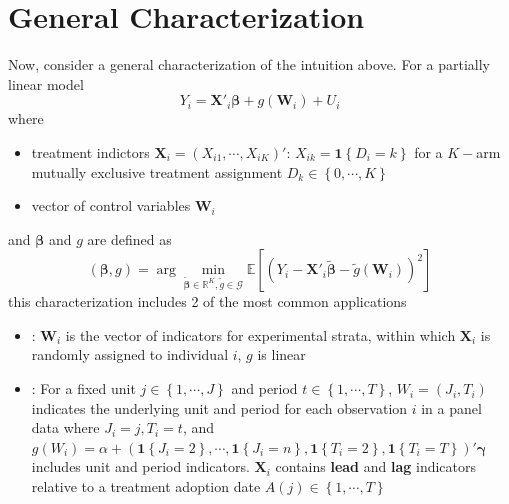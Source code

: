 \documentclass[twoside]{article}
\begin{document}
\section{General Characterization}
Now, consider a general characterization of the intuition above. For a partially linear model
\begin{equation}\label{eq:partial_linear_model}
    Y_i = \mathbf{X}'_i\boldsymbol{\beta} + g(\mathbf{W}_i) + U_i
\end{equation}
where 
\begin{itemize}
    \item treatment indictors $\mathbf{X}_i = \left( X_{i1},\cdots,X_{iK} \right)' $: $X_{ik} = \mathbf{1}\left\{D_i = k\right\}$ for a $K-$arm mutually exclusive treatment assignment $D_k\in \left\{0,\cdots, K\right\}$
    \item vector of control variables $\mathbf{W}_i$ 
\end{itemize}
and $\boldsymbol{\beta}$ and $g$ are defined as
\begin{equation}\label{eq:minimization_problem}
    (\boldsymbol{\beta},g) = \arg\min_{\tilde{\boldsymbol{\beta}}\in \mathbb{R}^K,\tilde{g}\in \mathcal{G}} \mathbb{E}\left[ \left( Y_i - \mathbf{X}'_i\tilde{\boldsymbol{\beta}}-\tilde{g}(\mathbf{W}_i) \right)^2 \right]
\end{equation}
this characterization includes 2 of the most common applications
\begin{itemize}
    \item {}: $\mathbf{W}_i$ is the vector of indicators for experimental strata, within which $\mathbf{X}_i$ is randomly assigned to individual $i$, $g$ is linear
    \item {}: For a fixed unit $j\in\left\{1,\cdots,J\right\}$ and period $t\in\left\{ 1,\cdots,T \right\}$, $W_i = (J_i,T_i)$ indicates the underlying unit and period for each observation $i$ in a panel data where $J_i=j,T_i=t$, and $g(W_i) = \alpha + \left(\mathbf{1}\left\{J_i=2\right\},\cdots,\mathbf{1}\left\{J_i=n\right\},\mathbf{1}\left\{T_i=2\right\},\mathbf{1}\left\{T_i=T\right\}\right)'\boldsymbol{\gamma}$ includes unit and period indicators. $\mathbf{X}_i$ contains \textbf{lead} and \textbf{lag} indicators relative to a treatment adoption date $A(j)\in \left\{ 1,\cdots, T \right\}$
\end{itemize}
\end{document}
